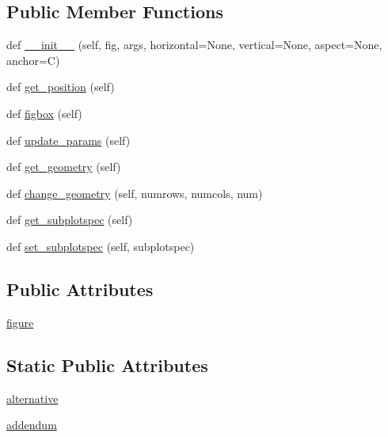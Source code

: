 \subsection*{Public Member Functions}
\begin{DoxyCompactItemize}
\item 
def \hyperlink{classaxes__grid1_1_1axes__divider_1_1SubplotDivider_adaf9b883194737fe03564c33d74f7cdd}{\+\_\+\+\_\+init\+\_\+\+\_\+} (self, fig, args, horizontal=None, vertical=None, aspect=None, anchor=\textquotesingle{}C\textquotesingle{})
\item 
def \hyperlink{classaxes__grid1_1_1axes__divider_1_1SubplotDivider_a460e2f330dbacd14c3828eedbc85d3a9}{get\+\_\+position} (self)
\item 
def \hyperlink{classaxes__grid1_1_1axes__divider_1_1SubplotDivider_a3013557e176de18c1c3a5341bd75a2ad}{figbox} (self)
\item 
def \hyperlink{classaxes__grid1_1_1axes__divider_1_1SubplotDivider_ab6ed6cc3b4764d08f5f63a949ad7bbae}{update\+\_\+params} (self)
\item 
def \hyperlink{classaxes__grid1_1_1axes__divider_1_1SubplotDivider_a8dd5a4ea0004dfc23872a1b215cb8c3b}{get\+\_\+geometry} (self)
\item 
def \hyperlink{classaxes__grid1_1_1axes__divider_1_1SubplotDivider_a2c7065101ef639ffa4eed74b73b12cb2}{change\+\_\+geometry} (self, numrows, numcols, num)
\item 
def \hyperlink{classaxes__grid1_1_1axes__divider_1_1SubplotDivider_a017f435c4c968979fa43b75ede0b7b71}{get\+\_\+subplotspec} (self)
\item 
def \hyperlink{classaxes__grid1_1_1axes__divider_1_1SubplotDivider_adce63c553e47ace4016db0a43ad34eff}{set\+\_\+subplotspec} (self, subplotspec)
\end{DoxyCompactItemize}
\subsection*{Public Attributes}
\begin{DoxyCompactItemize}
\item 
\hyperlink{classaxes__grid1_1_1axes__divider_1_1SubplotDivider_ac1e19f29e24965f294377fc52a1fa6bd}{figure}
\end{DoxyCompactItemize}
\subsection*{Static Public Attributes}
\begin{DoxyCompactItemize}
\item 
\hyperlink{classaxes__grid1_1_1axes__divider_1_1SubplotDivider_a236de25d17ac1538723b37267a9d8705}{alternative}
\item 
\hyperlink{classaxes__grid1_1_1axes__divider_1_1SubplotDivider_a8580519c508839dc9767fd4d8a182c74}{addendum}
\end{DoxyCompactItemize}



